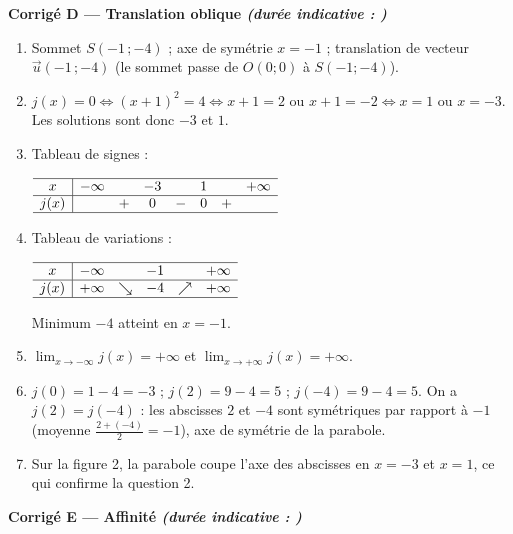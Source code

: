 \documentclass[11pt,a4paper]{article}
\newcommand{\partie}[2]{%
  \vspace{6pt}
  \noindent\colorbox{blue!12}{\parbox{\dimexpr\linewidth-2\fboxsep}{%
    \bfseries\color{blue!50!black} #1 \hfill \normalfont\small\itshape (durée indicative : #2)}}%
  \vspace{4pt}}
\begin{document}
\partie{Corrigé D — Translation oblique}{}

\begin{enumerate}[leftmargin=1.4em,itemsep=3pt]
  \item Sommet $S(-1\,;-4)$ ; axe de symétrie $x=-1$ ; translation de vecteur $\vec{u}(-1\,;-4)$
  (le sommet passe de $O(0;0)$ à $S(-1;-4)$).

  \item $j(x)=0\iff (x+1)^2=4\iff x+1=2$ ou $x+1=-2\iff x=1$ ou $x=-3$.
  Les solutions sont donc $-3$ et $1$.

  \item Tableau de signes :
  \begin{center}
  $\begin{array}{c|ccccccc}
  \hline
  x & -\infty & & -3 & & 1 & & +\infty\\ \hline
  j(x) & & + & 0 & - & 0 & + & \\ \hline
  \end{array}$
  \end{center}

  \item Tableau de variations :
  \begin{center}
  $\begin{array}{c|ccccc}
  \hline
  x & -\infty & & -1 & & +\infty\\ \hline
  j(x) & +\infty & \searrow & -4 & \nearrow & +\infty\\ \hline
  \end{array}$
  \end{center}
  Minimum $-4$ atteint en $x=-1$.

  \item $\displaystyle\lim_{x\to-\infty}j(x)=+\infty$ et $\displaystyle\lim_{x\to+\infty}j(x)=+\infty$.

  \item $j(0)=1-4=-3$ ; $j(2)=9-4=5$ ; $j(-4)=9-4=5$.
  On a $j(2)=j(-4)$ : les abscisses $2$ et $-4$ sont symétriques par rapport à $-1$
  (moyenne $\frac{2+(-4)}{2}=-1$), axe de symétrie de la parabole.

  \item Sur la figure 2, la parabole coupe l'axe des abscisses en $x=-3$ et $x=1$, ce qui confirme la question 2.
\end{enumerate}

\partie{Corrigé E — Affinité}{}
\end{document}
